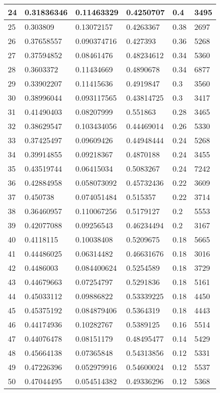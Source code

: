 \begin{longtable}{|l|l|l|l|l|l|}
24 & 0.31836346 & 0.11463329 & 0.4250707 & 0.4 & 3495 \\ \hline 
25 & 0.303809 & 0.13072157 & 0.4263367 & 0.38 & 2697 \\ \hline 
26 & 0.37658557 & 0.090374716 & 0.427393 & 0.36 & 5268 \\ \hline 
27 & 0.37594852 & 0.08461476 & 0.48234612 & 0.34 & 5360 \\ \hline 
28 & 0.3603372 & 0.11434669 & 0.4890678 & 0.34 & 6877 \\ \hline 
29 & 0.33902207 & 0.11415636 & 0.4919847 & 0.3 & 3560 \\ \hline 
30 & 0.38996044 & 0.093117565 & 0.43814725 & 0.3 & 3417 \\ \hline 
31 & 0.41490403 & 0.08207999 & 0.551863 & 0.28 & 3465 \\ \hline 
32 & 0.38629547 & 0.103434056 & 0.44469014 & 0.26 & 5330 \\ \hline 
33 & 0.37425497 & 0.09609426 & 0.44948444 & 0.24 & 5268 \\ \hline 
34 & 0.39914855 & 0.09218367 & 0.4870188 & 0.24 & 3455 \\ \hline 
35 & 0.43519744 & 0.06415034 & 0.5083267 & 0.24 & 7242 \\ \hline 
36 & 0.42884958 & 0.058073092 & 0.45732436 & 0.22 & 3609 \\ \hline 
37 & 0.450738 & 0.074051484 & 0.515357 & 0.22 & 3714 \\ \hline 
38 & 0.36460957 & 0.110067256 & 0.5179127 & 0.2 & 5553 \\ \hline 
39 & 0.42077088 & 0.09256543 & 0.46234494 & 0.2 & 3167 \\ \hline 
40 & 0.4118115 & 0.10038408 & 0.5209675 & 0.18 & 5665 \\ \hline 
41 & 0.44486025 & 0.06314482 & 0.46631676 & 0.18 & 3016 \\ \hline 
42 & 0.4486003 & 0.084400624 & 0.5254589 & 0.18 & 3729 \\ \hline 
43 & 0.44679663 & 0.07254797 & 0.5291836 & 0.18 & 5161 \\ \hline 
44 & 0.45033112 & 0.09886822 & 0.53339225 & 0.18 & 4450 \\ \hline 
45 & 0.45375192 & 0.084879406 & 0.5364319 & 0.18 & 4443 \\ \hline 
46 & 0.44174936 & 0.10282767 & 0.5389125 & 0.16 & 5514 \\ \hline 
47 & 0.44076478 & 0.08151179 & 0.48495477 & 0.14 & 5429 \\ \hline 
48 & 0.45664138 & 0.07365848 & 0.54313856 & 0.12 & 5331 \\ \hline 
49 & 0.47226396 & 0.052979916 & 0.54600024 & 0.12 & 5537 \\ \hline 
50 & 0.47044495 & 0.054514382 & 0.49336296 & 0.12 & 5368 \\ \hline 
\end{longtable}